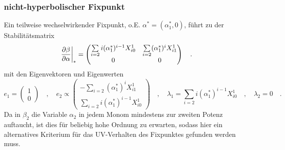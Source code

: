     \subsubsection{nicht-hyperbolischer Fixpunkt}\label{beta_im_R2:nicht-hyperbolischer_Fixpunkt}
	 Ein teilweise wechselwirkender Fixpunkt, o.E. 
	 $\alpha^*=(\alpha_1^*,0)$,  
	 führt zu der Stabilitätsmatrix 
	 \begin{equation}
	 \left.\frac{\partial \beta}{\partial \alpha}\right|_* = \begin{pmatrix}
	          \sum\limits_{i=2}i (\alpha_1^*)^{i-1}  X^1_{i0} &
	          \sum\limits_{i=2} (\alpha_1^*)^i  X^1_{i1}\\
	          0&
	          0
	         \end{pmatrix} \quad . \label{eq:beta_im_R2:stab_matrix_0}
	 \end{equation}
	 mit den Eigenvektoren und Eigenwerten
	 \begin{equation}
	 e_1=\begin{pmatrix}1 \\0 \end{pmatrix} \quad , \quad
	 e_2\propto\begin{pmatrix}
		  -\sum_{i=2} (\alpha_1^*)^i X^1_{i1} 
		   \\
		  \sum_{i=2}i (\alpha_1^*)^{i-1}  X^1_{i0} 
	           \end{pmatrix} \quad , \quad
	 \lambda_1 = \sum_{i=2}i (\alpha_1^*)^{i-1}  X^1_{i0} \quad , \quad
	     \lambda_2=0      \quad .
	 \end{equation}
	Da in $\beta_2$ die Variable $\alpha_2$ in jedem Monom  
	 mindestens zur zweiten Potenz auftaucht, ist dies für 
	 beliebig hohe Ordnung zu erwarten, sodass hier ein alternatives Kriterium 
	 für das UV-Verhalten des Fixpunktes gefunden werden muss.  


